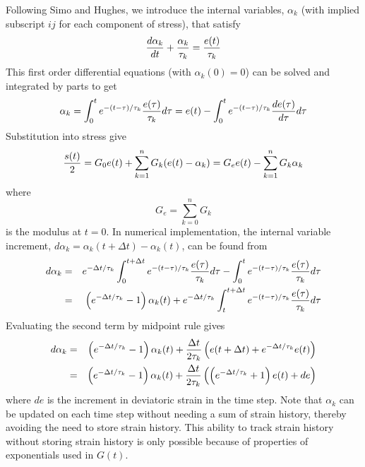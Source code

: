 \documentclass[11pt]{book}
\begin{document}
Following Simo and Hughes, we introduce the internal variables, $\alpha_k$ (with implied subscript $ij$ for each component of stress), that satisfy
\begin{equation}
       {d\alpha_k\over dt} + {\alpha_k\over \tau_k} = {e(t)\over \tau_k}
\end{equation}
This first order differential equations (with $\alpha_k(0)=0$) can be solved and integrated by parts to get
\begin{equation}
      \alpha_k = \int_0^t e^{-(t-\tau)/\tau_k} {e(\tau)\over \tau_k}d\tau = e(t) - \int_0^t e^{-(t-\tau)/\tau_k} {de(\tau)\over d\tau}d\tau
\end{equation}
Substitution into stress give
\begin{equation}
     {s(t)\over2} = G_0 e(t) + \sum_{k=1}^n G_k (e(t) - \alpha_k )= G_e e(t) -  \sum_{k=1}^n G_k \alpha_k    \label{sVsak}
\end{equation}
where
\begin{equation}
     G_e = \sum_{k=0}^n G_k
\end{equation}
is the modulus at $t=0$. In numerical implementation, the internal variable increment, $d\alpha_k = \alpha_k(t+\Delta t)-\alpha_k(t)$, can be found from
\begin{eqnarray}
      d\alpha_k  & = & e^{-\Delta t/\tau_k} \int_0^{t+\Delta t} e^{-(t-\tau)/\tau_k} {e(\tau)\over \tau_k}d\tau -  \int_0^t e^{-(t-\tau)/\tau_k} {e(\tau)\over \tau_k}d\tau \\
      & = & \left(e^{-\Delta t/\tau_k}-1\right)\alpha_k(t) + e^{-\Delta t/\tau_k} \int_t^{t+\Delta t} e^{-(t-\tau)/\tau_k} {e(\tau)\over \tau_k}d\tau 
\end{eqnarray}
Evaluating the second term by midpoint rule gives
\begin{eqnarray}
    d\alpha_k & = & \left(e^{-\Delta t/\tau_k}-1\right)\alpha_k(t) +  {\Delta t\over 2\tau_k}\left(e(t+\Delta t) +e^{-\Delta t/\tau_k}e(t)\right) \\
         & = & \left(e^{-\Delta t/\tau_k}-1\right)\alpha_k(t) +  {\Delta t\over 2\tau_k}\left(\left(e^{-\Delta t/\tau_k}+1\right)e(t) + de\right) 
\end{eqnarray}
where $de$ is the increment in deviatoric strain in the time step. Note that $\alpha_k$ can be updated on each time step without needing a sum of strain history, thereby avoiding the need to store strain history. This ability to track strain history without storing strain history is only possible because of properties of exponentials used in $G(t)$.
\end{document}
